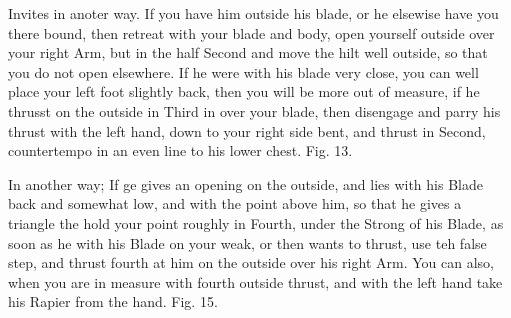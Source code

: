 \exercise{}

Invites in anoter way. If you have him outside his blade, or he
elsewise have you there bound, then retreat with your blade and body,
open yourself outside over your right Arm, but in the half Second and
move the hilt well outside, so that you do not open elsewhere. If he
were with his blade very close, you can well place your left foot
slightly back, then you will be more out of measure, if he thrusst on
the outside in Third in over your blade, then disengage and parry his
thrust with the left hand, down to your right side bent, and thrust in
Second, countertempo in an even line to his lower chest. Fig. 13.

\exercise{}


In another way; If ge gives an opening on the outside, and lies with
his Blade back and somewhat low, and with the point above him, so that
he gives a triangle the hold your point roughly in Fourth, under the
Strong of his Blade, as soon as he with his Blade on your weak, or
then wants to thrust, use teh false step, and thrust fourth at him on
the outside over his right Arm. You can also, when you are in measure
with fourth outside thrust, and with the left hand take his Rapier
from the hand. Fig. 15.



